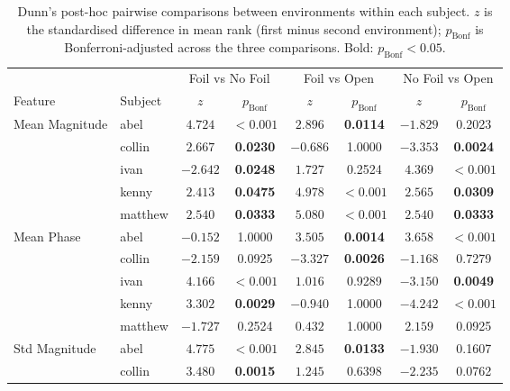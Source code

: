 \begin{table}[htbp]
  \centering
  \caption{Dunn's post-hoc pairwise comparisons between environments within
  each subject. $z$ is the standardised difference in mean rank (first minus
  second environment); $p_{\mathrm{Bonf}}$ is Bonferroni-adjusted across the three
  comparisons. Bold: $p_{\mathrm{Bonf}} < 0.05$.}
  \label{tab:dunn_per_subject}
  \begin{tabular}{llcccccc}
    \toprule
    & & \multicolumn{2}{c}{Foil vs No Foil} & \multicolumn{2}{c}{Foil vs Open} & \multicolumn{2}{c}{No Foil vs Open} \\
    \cmidrule(lr){3-4} \cmidrule(lr){5-6} \cmidrule(lr){7-8}
    Feature & Subject & $z$ & $p_{\mathrm{Bonf}}$ & $z$ & $p_{\mathrm{Bonf}}$ & $z$ & $p_{\mathrm{Bonf}}$ \\
    \midrule
    \multirow{5}{*}{Mean Magnitude}
      & abel    & $4.724$ & $\mathbf{<0.001}$ & $2.896$ & \textbf{0.0114} & $-1.829$ & 0.2023 \\
      & collin  & $2.667$ & \textbf{0.0230} & $-0.686$ & 1.0000 & $-3.353$ & \textbf{0.0024} \\
      & ivan    & $-2.642$ & \textbf{0.0248} & $1.727$ & 0.2524 & $4.369$ & $\mathbf{<0.001}$ \\
      & kenny   & $2.413$ & \textbf{0.0475} & $4.978$ & $\mathbf{<0.001}$ & $2.565$ & \textbf{0.0309} \\
      & matthew & $2.540$ & \textbf{0.0333} & $5.080$ & $\mathbf{<0.001}$ & $2.540$ & \textbf{0.0333} \\
    \midrule
    \multirow{5}{*}{Mean Phase}
      & abel    & $-0.152$ & 1.0000 & $3.505$ & \textbf{0.0014} & $3.658$ & $\mathbf{<0.001}$ \\
      & collin  & $-2.159$ & 0.0925 & $-3.327$ & \textbf{0.0026} & $-1.168$ & 0.7279 \\
      & ivan    & $4.166$ & $\mathbf{<0.001}$ & $1.016$ & 0.9289 & $-3.150$ & \textbf{0.0049} \\
      & kenny   & $3.302$ & \textbf{0.0029} & $-0.940$ & 1.0000 & $-4.242$ & $\mathbf{<0.001}$ \\
      & matthew & $-1.727$ & 0.2524 & $0.432$ & 1.0000 & $2.159$ & 0.0925 \\
    \midrule
    \multirow{5}{*}{Std Magnitude}
      & abel    & $4.775$ & $\mathbf{<0.001}$ & $2.845$ & \textbf{0.0133} & $-1.930$ & 0.1607 \\
      & collin  & $3.480$ & \textbf{0.0015} & $1.245$ & 0.6398 & $-2.235$ & 0.0762 \\

\end{tabular}
\end{table}
